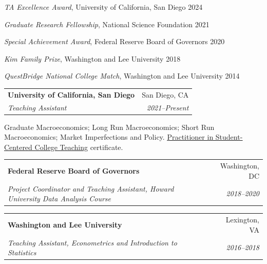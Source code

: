 \documentclass[a4paper,11pt]{article}
\makeatletter
\renewcommand{\sectionBlock}[2]{%
  \noindent
  \begin{minipage}[t]{2.45cm}
    \raggedright #1
  \end{minipage}%
  \hspace{0.5cm}%
  \begin{minipage}[t]{\dimexpr\linewidth-3.05cm\relax}
    \raggedright #2
  \end{minipage}
  \vspace{18pt}
}
\newcommand{\experienceHeading}[4]{%
  \begin{tabularx}{\linewidth}[t]{@{}Xr@{}}
    \textbf{#1} & #2 \\
    \textit{#3} & \textit{#4}
  \end{tabularx}\vspace{1pt}
}
\makeatother
\begin{document}
\sectionBlock{
}{
\awardListStart
  \item \emph{TA Excellence Award}, University of California, San Diego \hfill 2024
  \item \emph{Graduate Research Fellowship}, National Science Foundation \hfill 2021
  \item \emph{Special Achievement Award}, Federal Reserve Board of Governors \hfill 2020
  \item \emph{Kim Family Prize}, Washington and Lee University \hfill 2018
  \item \emph{QuestBridge National College Match}, Washington and Lee University \hfill 2014
\awardListEnd
}

\sectionBlock{
}{
\experienceHeading
  {University of California, San Diego}{San Diego, CA}
  {Teaching Assistant}{2021--Present}
Graduate Macroeconomics; Long Run Macroeconomics; Short Run Macroeconomics; Market Imperfections and Policy. \href{https://badges.parchment.com/public/assertions/U_vPUBS7QPGHKIBTs5GwXA}{\underline{Practitioner in Student-Centered College Teaching}} certificate.

\vspace{7pt}
\experienceHeading
  {Federal Reserve Board of Governors}{Washington, DC}
  {Project Coordinator and Teaching Assistant, Howard University Data Analysis Course}{2018--2020}

\vspace{7pt}
\experienceHeading
  {Washington and Lee University}{Lexington, VA}
  {Teaching Assistant, Econometrics and Introduction to Statistics}{2016--2018}
}
\end{document}
